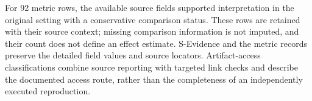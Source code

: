 For 92 metric rows, the available source fields supported interpretation in
the original setting with a conservative comparison status. These rows are
retained with their source context; missing comparison information is not
imputed, and their count does not define an effect estimate. S-Evidence and
the metric records preserve the detailed field values and source locators.
Artifact-access classifications combine source reporting with targeted link
checks and describe the documented access route, rather than the completeness
of an independently executed reproduction.
